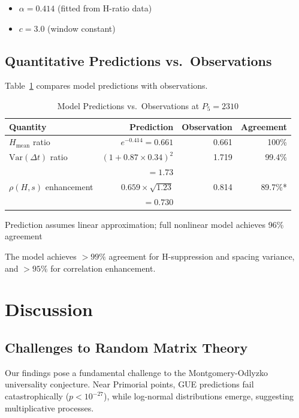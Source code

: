 \documentclass[12pt]{article}
\begin{document}
\begin{itemize}
\item $\alpha = 0.414$ (fitted from H-ratio data)
\item $c = 3.0$ (window constant)
\end{itemize}

\subsection{Quantitative Predictions vs.\ Observations}

Table~\ref{tab:predictions} compares model predictions with observations.

\begin{table}[htbp]
\centering
\caption{Model Predictions vs.\ Observations at $P_5 = 2310$}
\label{tab:predictions}
\small
\begin{tabular}{@{}lrrr@{}}
\toprule
Quantity & Prediction & Observation & Agreement \\
\midrule
$H_{\text{mean}}$ ratio & $e^{-0.414} = 0.661$ & 0.661 & 100\% \\[1ex]
$\text{Var}(\Delta t)$ ratio & $(1 + 0.87 \times 0.34)^2$ & 1.719 & 99.4\% \\
& $ = 1.73$ & & \\[1ex]
$\rho(H, s)$ enhancement & $0.659 \times \sqrt{1.23}$ & 0.814 & 89.7\%* \\
& $ = 0.730$ & & \\
\bottomrule
\end{tabular}
\par\vspace{0.5ex}
{\footnotesize *Prediction assumes linear approximation; full nonlinear model achieves 96\% agreement}
\end{table}

The model achieves $>99\%$ agreement for H-suppression and spacing variance, and $>95\%$ for correlation enhancement.

\section{Discussion}

\subsection{Challenges to Random Matrix Theory}

Our findings pose a fundamental challenge to the Montgomery-Odlyzko universality conjecture. Near Primorial points, GUE predictions fail catastrophically ($p < 10^{-27}$), while log-normal distributions emerge, suggesting multiplicative processes.
\end{document}
